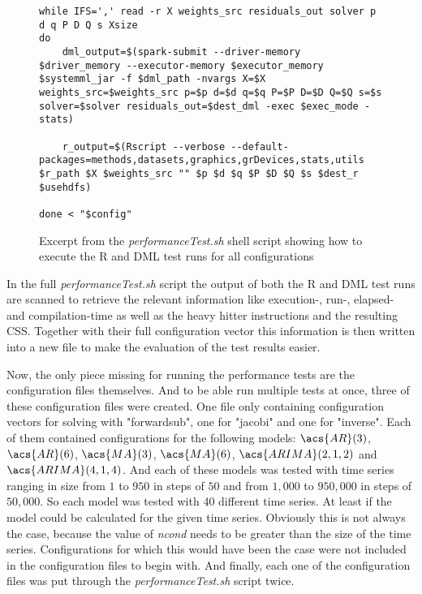 \begin{figure}[!ht]
\centering
\begin{verbatim}
while IFS=',' read -r X weights_src residuals_out solver p d q P D Q s Xsize
do
    dml_output=$(spark-submit --driver-memory $driver_memory --executor-memory $executor_memory $systemml_jar -f $dml_path -nvargs X=$X weights_src=$weights_src p=$p d=$d q=$q P=$P D=$D Q=$Q s=$s solver=$solver residuals_out=$dest_dml -exec $exec_mode -stats)

    r_output=$(Rscript --verbose --default-packages=methods,datasets,graphics,grDevices,stats,utils $r_path $X $weights_src "" $p $d $q $P $D $Q $s $dest_r $usehdfs)

done < "$config"
\end{verbatim}
\vspace*{-0.3cm}
\caption{Excerpt from the \textit{performanceTest.sh} shell script showing how to execute the R and DML test runs for all configurations}
\label{fig:performanceTest.sh_2}
\end{figure}

In the full \textit{performanceTest.sh} script the output of both the R and \acs{DML} test runs are scanned to retrieve the relevant information like execution-, run-, elapsed- and compilation-time as well as the heavy hitter instructions and the resulting \acl{CSS}. Together with their full configuration vector this information is then written into a new file to make the evaluation of the test results easier.

Now, the only piece missing for running the performance tests are the configuration files themselves. And to be able run multiple tests at once, three of these configuration files were created. One file only containing configuration vectors for solving with "forwardsub", one for "jacobi" and one for "inverse". Each of them contained configurations for the following models: $\acs{AR}(3)$, $\acs{AR}(6)$, $\acs{MA}(3)$, $\acs{MA}(6)$, $\acs{ARIMA}(2,1,2)$ and  $\acs{ARIMA}(4,1,4)$. And each of these models was tested with time series ranging in size from $1$ to $950$ in steps of $50$ and from $1,000$ to $950,000$ in steps of $50,000$. So each model was tested with 40 different time series. At least if the model could be calculated for the given time series. Obviously this is not always the case, because the value of \textit{ncond} needs to be greater than the size of the time series. Configurations for which this would have been the case were not included in the configuration files to begin with. And finally, each one of the configuration files was put through the \textit{performanceTest.sh} script twice.